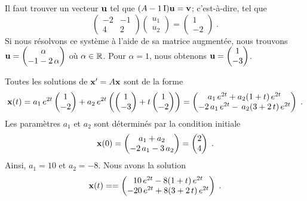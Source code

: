 {\begin{egg}
Il faut trouver un vecteur $\mathbf{u}$ tel que $(A-1\operatorname{I})\mathbf{u} = \mathbf{v}$;
c'est-à-dire, tel que
\[
\begin{pmatrix} -2 & -1 \\ 4 & 2 \end{pmatrix}
\begin{pmatrix} u_1 \\ u_2 \end{pmatrix}
= \begin{pmatrix} 1 \\ -2 \end{pmatrix} \; .
\]
Si nous résolvons ce système à l'aide de sa matrice augmentée, nous trouvons
$\displaystyle
\mathbf{u} = \begin{pmatrix} \alpha \\ -1 - 2\,\alpha \end{pmatrix}$
où $\alpha \in \mathbb{R}$.  Pour $\alpha = 1$, nous obtenons
$\displaystyle \mathbf{u} = \begin{pmatrix} 1 \\ -3 \end{pmatrix}$.

Toutes les solutions de $\mathbf{x}'= A \mathbf{x}$ sont de la forme
\[
\mathbf{x}(t) = a_1 \, e^{2t}\begin{pmatrix} 1 \\ -2 \end{pmatrix}
+ a_2 \, e^{2t} \left( \begin{pmatrix} 1 \\ -3 \end{pmatrix}
+t \begin{pmatrix} 1 \\ -2 \end{pmatrix} \right)
= \begin{pmatrix}
a_1 \, e^{2t} + a_2 (1+t)\, e^{2t} \\
-2\,a_1 \, e^{2t} -\, a_2 (3+2\,t)\, e^{2t}
\end{pmatrix} \; .
\]
Les paramètres $a_1$ et $a_2$ sont déterminés par la condition initiale
\[
\mathbf{x}(0) = \begin{pmatrix} a_1 + a_2 \\ -2\,a_1 - 3\,a_2 \end{pmatrix}
= \begin{pmatrix} 2 \\ 4 \end{pmatrix}  \; .
\]
Ainsi, $a_1=10$ et $a_2=-8$.  Nous avons la solution
\[
\mathbf{x}(t) =
= \begin{pmatrix}
10 \, e^{2t} - 8 (1+t)\, e^{2t} \\
-20 \, e^{2t} + 8 (3+2\,t)\, e^{2t}
\end{pmatrix} \; .
\]
\end{egg}

}
